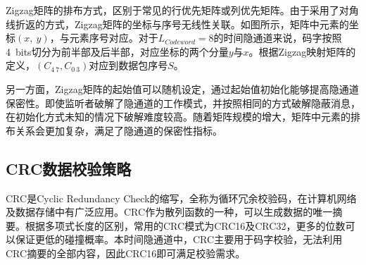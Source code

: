 
Zigzag矩阵的排布方式，区别于常见的行优先矩阵或列优先矩阵。由于采用了对角线折返的方式，Zigzag矩阵的坐标与序号无线性关联。如图所示，矩阵中元素的坐标$(x,\ y)$，与元素序号对应。对于$L_{Codeword}=8$的时间隐通道来说，码字按照{4\ bits}切分为前半部及后半部，对应坐标的两个分量$y$与$x$。根据Zigzag映射矩阵的定义，$(C_{4~7},C_{0~3})$对应到数据包序号$S$。

另一方面，Zigzag矩阵的起始值可以随机设定，通过起始值初始化能够提高隐通道保密性。即使监听者破解了隐通道的工作模式，并按照相同的方式破解隐蔽消息，在初始化方式未知的情况下破解难度较高。随着矩阵规模的增大，矩阵中元素的排布关系会更加复杂，满足了隐通道的保密性指标。

\subsection{CRC数据校验策略}
\label{chap:zigzag:motivation:crc}

CRC是Cyclic Redundancy Check的缩写，全称为循环冗余校验码，在计算机网络及数据存储中有广泛应用。CRC作为散列函数的一种，可以生成数据的唯一摘要。根据多项式长度的区别，常用的CRC模式为CRC16及CRC32，更多的位数可以保证更低的碰撞概率。本时间隐通道中，CRC主要用于码字校验，无法利用CRC摘要的全部内容，因此CRC16即可满足校验需求。


